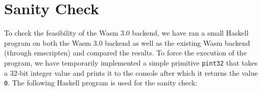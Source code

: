 
\section{Sanity Check}
To check the feasibility of the Wasm 3.0 backend, we have ran a small Haskell program on both the Wasm 3.0 backend as well as the existing Wasm backend (through emscripten) and compared the results. To force the execution of the program, we have temporarily implemented a simple primitive \verb|pint32| that takes a 32-bit integer value and prints it to the console after which it returns the value \verb|0|. The following Haskell program is used for the sanity check: 

